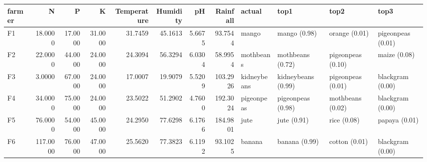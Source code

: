 \begin{tabular}{lrrrrrrrllll}
\toprule
farmer & N & P & K & Temperature & Humidity & pH & Rainfall & actual & top1 & top2 & top3 \\
\midrule
F1 & 18.0000 & 17.0000 & 31.0000 & 31.7459 & 45.1613 & 5.6675 & 93.7544 & mango & mango (0.98) & orange (0.01) & pigeonpeas (0.01) \\
F2 & 22.0000 & 44.0000 & 24.0000 & 24.3094 & 56.3294 & 6.0304 & 58.9954 & mothbeans & mothbeans (0.72) & pigeonpeas (0.10) & maize (0.08) \\
F3 & 3.0000 & 67.0000 & 24.0000 & 17.0007 & 19.9079 & 5.5209 & 103.2926 & kidneybeans & kidneybeans (0.99) & pigeonpeas (0.01) & blackgram (0.00) \\
F4 & 34.0000 & 75.0000 & 24.0000 & 23.5022 & 51.2902 & 4.7600 & 192.3024 & pigeonpeas & pigeonpeas (0.98) & mothbeans (0.02) & blackgram (0.00) \\
F5 & 76.0000 & 54.0000 & 45.0000 & 24.2950 & 77.6298 & 6.1766 & 184.9801 & jute & jute (0.91) & rice (0.08) & papaya (0.01) \\
F6 & 117.0000 & 76.0000 & 47.0000 & 25.5620 & 77.3823 & 6.1192 & 93.1025 & banana & banana (0.99) & cotton (0.01) & blackgram (0.00) \\
\bottomrule
\end{tabular}
